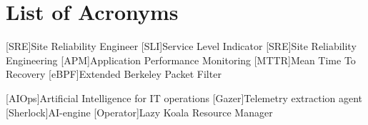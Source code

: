 \chapter*{List of Acronyms}

\begin{acronym}
[SRE]{Site Reliability Engineer}
[SLI]{Service Level Indicator}
[SRE]{Site Reliability Engineering}
[APM]{Application Performance Monitoring}
[MTTR]{Mean Time To Recovery}
[eBPF]{Extended Berkeley Packet Filter}

[AIOps]{Artificial Intelligence for IT operations}
[Gazer]{Telemetry extraction agent}
[Sherlock]{AI-engine}
[Operator]{Lazy Koala Resource Manager}
\end{acronym}